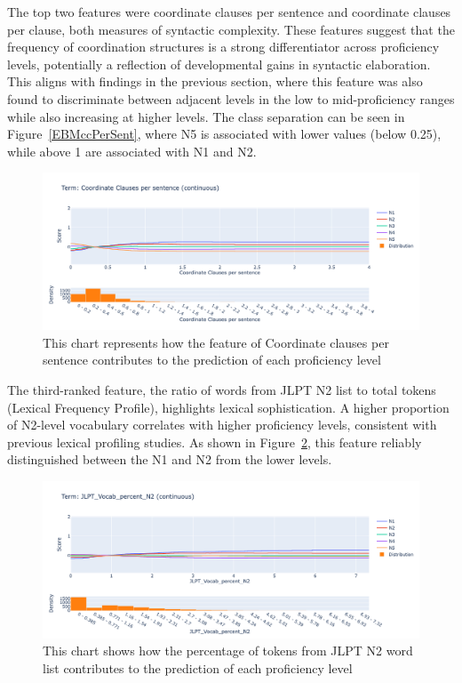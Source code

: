 The top two features were coordinate clauses per sentence and coordinate clauses per clause, both measures of
syntactic complexity. These features suggest that the frequency of coordination structures is a strong
differentiator across proficiency levels, potentially a reflection of developmental gains in syntactic elaboration. This
aligns with findings in the previous section, where this feature was also found to discriminate between adjacent
levels in
the low to mid-proficiency ranges while also increasing at higher levels. The class
separation can be seen in Figure~\ref{EBMccPerSent}, where N5 is associated with lower values (below 0.25),
while above 1 are associated with N1 and N2.


\begin{figure}[h!]
    \centering
    \includegraphics[scale=.4]{img/EBM/EBMccPerSent}
    \caption[Contribution of Coordinate Clauses per Sentence]{This chart represents how the feature of Coordinate clauses per sentence contributes to the prediction of each proficiency level}
    \label{fig:EBMccPerSent}
\end{figure}


The third-ranked feature, the ratio of words from JLPT N2 list to total tokens (Lexical Frequency Profile), highlights
lexical sophistication. A higher proportion of N2-level vocabulary
correlates with higher proficiency levels, consistent with previous lexical profiling studies\citep{Laufer1995}.
As shown in Figure~\ref{fig:EBMjlptN2}, this feature reliably distinguished between the N1 and N2 from the lower
levels.

\begin{figure}[h!]
    \centering
    \includegraphics[scale=.4]{img/EBM/JLPTn2P}
    \caption[Contribution of percentage of tokens from JLPT N2 vocabulary list]{This chart shows how the percentage of tokens from JLPT N2 word list contributes to the prediction of each proficiency level}
    \label{fig:EBMjlptN2}
\end{figure}


